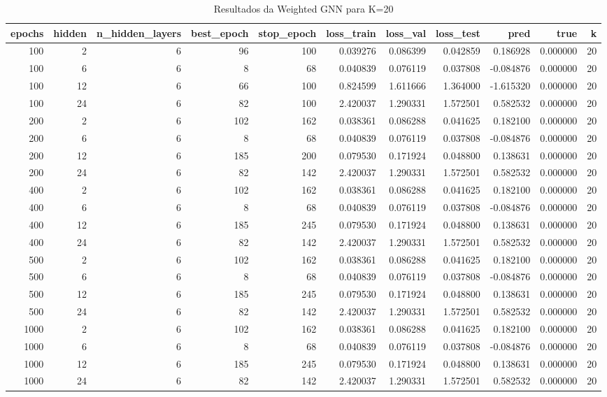 \begin{table}
\caption{Resultados da Weighted GNN para K=20}
\label{tab:weighted_gnn_results_k20}
\begin{tabular}{rrrrrrrrrrr}
\toprule
epochs & hidden & n\_hidden\_layers & best\_epoch & stop\_epoch & loss\_train & loss\_val & loss\_test & pred & true & k \\
\midrule
100 & 2 & 6 & 96 & 100 & 0.039276 & 0.086399 & 0.042859 & 0.186928 & 0.000000 & 20 \\
100 & 6 & 6 & 8 & 68 & 0.040839 & 0.076119 & 0.037808 & -0.084876 & 0.000000 & 20 \\
100 & 12 & 6 & 66 & 100 & 0.824599 & 1.611666 & 1.364000 & -1.615320 & 0.000000 & 20 \\
100 & 24 & 6 & 82 & 100 & 2.420037 & 1.290331 & 1.572501 & 0.582532 & 0.000000 & 20 \\
200 & 2 & 6 & 102 & 162 & 0.038361 & 0.086288 & 0.041625 & 0.182100 & 0.000000 & 20 \\
200 & 6 & 6 & 8 & 68 & 0.040839 & 0.076119 & 0.037808 & -0.084876 & 0.000000 & 20 \\
200 & 12 & 6 & 185 & 200 & 0.079530 & 0.171924 & 0.048800 & 0.138631 & 0.000000 & 20 \\
200 & 24 & 6 & 82 & 142 & 2.420037 & 1.290331 & 1.572501 & 0.582532 & 0.000000 & 20 \\
400 & 2 & 6 & 102 & 162 & 0.038361 & 0.086288 & 0.041625 & 0.182100 & 0.000000 & 20 \\
400 & 6 & 6 & 8 & 68 & 0.040839 & 0.076119 & 0.037808 & -0.084876 & 0.000000 & 20 \\
400 & 12 & 6 & 185 & 245 & 0.079530 & 0.171924 & 0.048800 & 0.138631 & 0.000000 & 20 \\
400 & 24 & 6 & 82 & 142 & 2.420037 & 1.290331 & 1.572501 & 0.582532 & 0.000000 & 20 \\
500 & 2 & 6 & 102 & 162 & 0.038361 & 0.086288 & 0.041625 & 0.182100 & 0.000000 & 20 \\
500 & 6 & 6 & 8 & 68 & 0.040839 & 0.076119 & 0.037808 & -0.084876 & 0.000000 & 20 \\
500 & 12 & 6 & 185 & 245 & 0.079530 & 0.171924 & 0.048800 & 0.138631 & 0.000000 & 20 \\
500 & 24 & 6 & 82 & 142 & 2.420037 & 1.290331 & 1.572501 & 0.582532 & 0.000000 & 20 \\
1000 & 2 & 6 & 102 & 162 & 0.038361 & 0.086288 & 0.041625 & 0.182100 & 0.000000 & 20 \\
1000 & 6 & 6 & 8 & 68 & 0.040839 & 0.076119 & 0.037808 & -0.084876 & 0.000000 & 20 \\
1000 & 12 & 6 & 185 & 245 & 0.079530 & 0.171924 & 0.048800 & 0.138631 & 0.000000 & 20 \\
1000 & 24 & 6 & 82 & 142 & 2.420037 & 1.290331 & 1.572501 & 0.582532 & 0.000000 & 20 \\
\bottomrule
\end{tabular}
\end{table}
